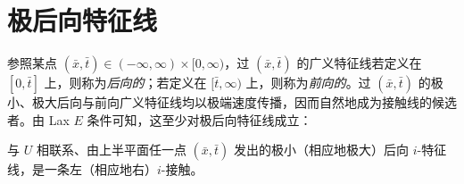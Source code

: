 \documentclass[../../main.tex]{subfiles}
\begin{document}
\section{极后向特征线}\label{section:ch10-极后向特征线}

参照某点 $(\bar{x},\bar{t})\in(-\infty,\infty)\times[0,\infty)$，过 $(\bar{x},\bar{t})$ 的广义特征线若定义在 $[0,\bar{t}]$ 上，则称为\emph{后向的}；若定义在 $[\bar{t},\infty)$ 上，则称为\emph{前向的}。过 $(\bar{x},\bar{t})$ 的极小、极大后向与前向广义特征线均以极端速度传播，因而自然地成为接触线的候选者。由 Lax $E$ 条件可知，这至少对极后向特征线成立：

\begin{theorem}\label{theorem:ch10-极后向特征线为接触}
与 $U$ 相联系、由上半平面任一点 $(\bar{x},\bar{t})$ 发出的极小（相应地极大）后向 $i$-特征线，是一条左（相应地右）$i$-接触。
\end{theorem}
\end{document}

